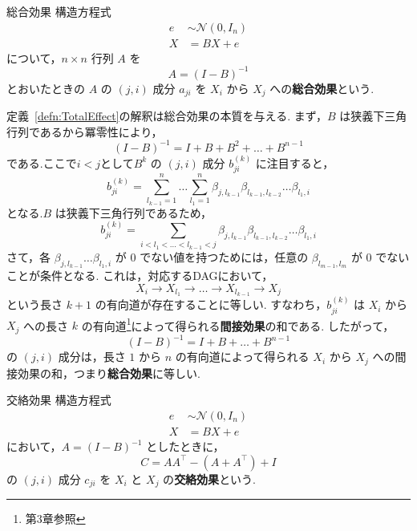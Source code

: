 \documentclass[uplatex, dvipdfmx]{jsarticle}
\begin{document}
\begin{defn}[label={defn:TotalEffect}]{総合効果}
  構造方程式
  \begin{align}
    e &\sim \mathcal{N}(0, I_n) \\
    X &= BX + e
  \end{align}
  について，$n \times n$ 行列 $A$ を
  \begin{equation}
    A = (I - B)^{-1}
  \end{equation}
  とおいたときの $A$ の $(j, i)$ 成分 $a_{ji}$ を $X_i$ から $X_j$ への\textbf{総合効果}という.
\end{defn}

定義~\ref{defn:TotalEffect}の解釈は総合効果の本質を与える.
まず，$B$ は狭義下三角行列であるから冪零性により，
\begin{equation}
  (I - B)^{-1} = I + B + B^2 + \dots + B^{n-1}
\end{equation}
である.ここで$i<j$として$B^k$ の $(j, i)$ 成分 $b_{ji}^{(k)}$ に注目すると，
\begin{equation}
  b_{ji}^{(k)} = \sum_{l_{k-1}=1}^{n} \dots \sum_{l_1=1}^{n} \beta_{j, l_{k-1}} \beta_{l_{k-1}, l_{k-2}} \dots \beta_{l_1, i}
\end{equation}
となる.$B$ は狭義下三角行列であるため，
\begin{equation}
  b_{ji}^{(k)} = \sum_{i < l_1 < \dots < l_{k-1} < j} \beta_{j, l_{k-1}} \beta_{l_{k-1}, l_{k-2}} \dots \beta_{l_1, i}
\end{equation}
さて，各 $\beta_{j, l_{k-1}} \dots \beta_{l_1, i}$ が $0$ でない値を持つためには，任意の $\beta_{l_{m-1}, l_m}$ が $0$ でないことが条件となる.
これは，対応するDAGにおいて，
\begin{equation}
  X_i \to X_{l_1} \to \dots \to X_{l_{k-1}} \to X_j
\end{equation}
という長さ $k+1$ の有向道が存在することに等しい.
すなわち，$b_{ji}^{(k)}$ は $X_i$ から $X_j$ への長さ $k$ の有向道\footnote{第3章参照}によって得られる\textbf{間接効果}の和である.
したがって，
\begin{equation}
  (I - B)^{-1} = I + B + \dots + B^{n-1}
\end{equation}
の $(j, i)$ 成分は，長さ $1$ から $n$ の有向道によって得られる $X_i$ から $X_j$ への間接効果の和，つまり\textbf{総合効果}に等しい.

\begin{defn}[label={defn:ConfoundingEffect}]{交絡効果}
  構造方程式
  \begin{align}
    e &\sim \mathcal{N}(0, I_n) \\
    X &= BX + e
  \end{align}
  において，$A = (I - B)^{-1}$ としたときに，
  \begin{equation}
    C = AA^\top - (A + A^\top) + I
  \end{equation}
  の $(j, i)$ 成分 $c_{ji}$ を $X_i$ と $X_j$ の\textbf{交絡効果}という.
\end{defn}
\end{document}
